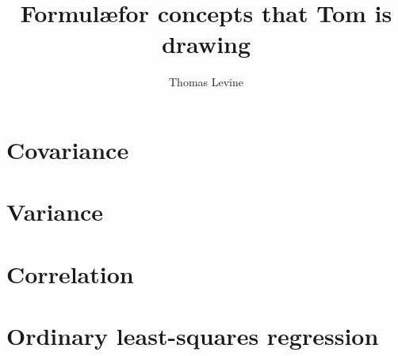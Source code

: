 \documentclass{article}
\title{Formul\ae for concepts that Tom is drawing}
\author{Thomas Levine}
\begin{document}
\section{Covariance}
\section{Variance}
\section{Correlation}
\section{Ordinary least-squares regression}
\end{document}
